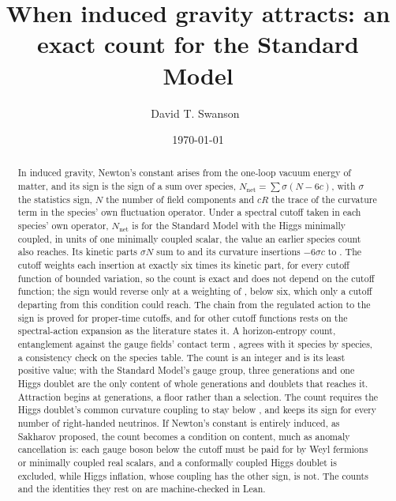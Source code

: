 \documentclass[aps,prd,reprint,amsmath,amssymb,superscriptaddress,nofootinbib]{revtex4-2}
\newcommand{\Nnet}{N_{\mathrm{net}}}
\begin{document}
\title{When induced gravity attracts: an exact count for the Standard Model}

\author{David T. Swanson~}
\noaffiliation

\date{\today}

\begin{abstract}
In induced gravity, Newton's constant arises from the one-loop vacuum energy of
matter, and its sign is the sign of a sum over species, $\Nnet=\sum\sigma(N-6c)$,
with $\sigma$ the statistics sign, $N$ the number of field components and $cR$ the
trace of the curvature term in the species' own fluctuation operator. Under a
spectral cutoff taken in each species' own operator, $\Nnet$ is \smNet{} for the
Standard Model with the Higgs minimally coupled, in units of one minimally coupled
scalar, the value an earlier species count also reaches. Its kinetic parts $\sigma N$
sum to \smKinetic{} and its curvature insertions $-6\sigma c$ to \smInsertion{}. The
cutoff weights each insertion at exactly six times its kinetic part, for every cutoff
function of bounded variation, so the count is exact and does not depend on the cutoff
function; the sign would reverse only at a weighting of \smThreshold{}, \smMarginPct{}
below six, which only a cutoff departing from this condition could reach. The chain
from the regulated action to the sign is proved for proper-time cutoffs, and for other
cutoff functions rests on the spectral-action expansion as the literature states it. A
horizon-entropy count, entanglement \smEntanglement{} against the gauge fields' contact
term \smContact{}, agrees with it species by species, a consistency check on the
species table. The count is an integer and \smNet{} is its least positive value; with
the Standard Model's gauge group, three generations and one Higgs doublet are the only
content of whole generations and doublets that reaches it. Attraction begins at
\floorGenerationsSpelled{} generations, a floor rather than a selection. The count
requires the Higgs doublet's common curvature coupling to stay below
\smCouplingBound{}, and keeps its sign for every number of right-handed neutrinos. If
Newton's constant is entirely induced, as Sakharov proposed, the count becomes a
condition on content, much as anomaly cancellation is: each gauge boson below the cutoff
must be paid for by \matterPerBosonSpelled{} Weyl fermions or minimally coupled real
scalars, and a conformally coupled Higgs doublet is excluded, while Higgs inflation,
whose coupling has the other sign, is not. The counts and the identities they rest on
are machine-checked in Lean.
\end{abstract}
\end{document}
